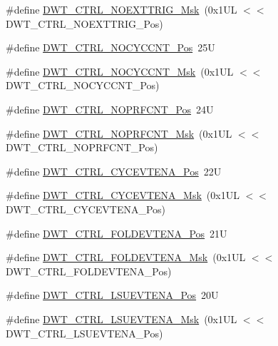 \begin{DoxyCompactItemize}
\item 
\#define \hyperlink{group___c_m_s_i_s___d_w_t_gacc7d15edf7a27147c422099ab475953e}{D\+W\+T\+\_\+\+C\+T\+R\+L\+\_\+\+N\+O\+E\+X\+T\+T\+R\+I\+G\+\_\+\+Msk}~(0x1\+U\+L $<$$<$ D\+W\+T\+\_\+\+C\+T\+R\+L\+\_\+\+N\+O\+E\+X\+T\+T\+R\+I\+G\+\_\+\+Pos)
\item 
\#define \hyperlink{group___c_m_s_i_s___d_w_t_ga337f6167d960f57f12aa382ffecce522}{D\+W\+T\+\_\+\+C\+T\+R\+L\+\_\+\+N\+O\+C\+Y\+C\+C\+N\+T\+\_\+\+Pos}~25U
\item 
\#define \hyperlink{group___c_m_s_i_s___d_w_t_gaf40c8d7a4fd978034c137e90f714c143}{D\+W\+T\+\_\+\+C\+T\+R\+L\+\_\+\+N\+O\+C\+Y\+C\+C\+N\+T\+\_\+\+Msk}~(0x1\+U\+L $<$$<$ D\+W\+T\+\_\+\+C\+T\+R\+L\+\_\+\+N\+O\+C\+Y\+C\+C\+N\+T\+\_\+\+Pos)
\item 
\#define \hyperlink{group___c_m_s_i_s___d_w_t_gad52a0e5be84363ab166cc17beca0d048}{D\+W\+T\+\_\+\+C\+T\+R\+L\+\_\+\+N\+O\+P\+R\+F\+C\+N\+T\+\_\+\+Pos}~24U
\item 
\#define \hyperlink{group___c_m_s_i_s___d_w_t_gafd8448d7db4bc51f27f202e6e1f27823}{D\+W\+T\+\_\+\+C\+T\+R\+L\+\_\+\+N\+O\+P\+R\+F\+C\+N\+T\+\_\+\+Msk}~(0x1\+U\+L $<$$<$ D\+W\+T\+\_\+\+C\+T\+R\+L\+\_\+\+N\+O\+P\+R\+F\+C\+N\+T\+\_\+\+Pos)
\item 
\#define \hyperlink{group___c_m_s_i_s___d_w_t_ga0cb0640aaeb18a626d7823570d5c3cb6}{D\+W\+T\+\_\+\+C\+T\+R\+L\+\_\+\+C\+Y\+C\+E\+V\+T\+E\+N\+A\+\_\+\+Pos}~22U
\item 
\#define \hyperlink{group___c_m_s_i_s___d_w_t_ga40554bd81460e39abf08810f45fac1a2}{D\+W\+T\+\_\+\+C\+T\+R\+L\+\_\+\+C\+Y\+C\+E\+V\+T\+E\+N\+A\+\_\+\+Msk}~(0x1\+U\+L $<$$<$ D\+W\+T\+\_\+\+C\+T\+R\+L\+\_\+\+C\+Y\+C\+E\+V\+T\+E\+N\+A\+\_\+\+Pos)
\item 
\#define \hyperlink{group___c_m_s_i_s___d_w_t_ga5602b0707f446ce78d88ff2a3a82bfff}{D\+W\+T\+\_\+\+C\+T\+R\+L\+\_\+\+F\+O\+L\+D\+E\+V\+T\+E\+N\+A\+\_\+\+Pos}~21U
\item 
\#define \hyperlink{group___c_m_s_i_s___d_w_t_ga717e679d775562ae09185a3776b1582f}{D\+W\+T\+\_\+\+C\+T\+R\+L\+\_\+\+F\+O\+L\+D\+E\+V\+T\+E\+N\+A\+\_\+\+Msk}~(0x1\+U\+L $<$$<$ D\+W\+T\+\_\+\+C\+T\+R\+L\+\_\+\+F\+O\+L\+D\+E\+V\+T\+E\+N\+A\+\_\+\+Pos)
\item 
\#define \hyperlink{group___c_m_s_i_s___d_w_t_gaea5d1ee72188dc1d57b54c60a9f5233e}{D\+W\+T\+\_\+\+C\+T\+R\+L\+\_\+\+L\+S\+U\+E\+V\+T\+E\+N\+A\+\_\+\+Pos}~20U
\item 
\#define \hyperlink{group___c_m_s_i_s___d_w_t_gac47427f455fbc29d4b6f8a479169f2b2}{D\+W\+T\+\_\+\+C\+T\+R\+L\+\_\+\+L\+S\+U\+E\+V\+T\+E\+N\+A\+\_\+\+Msk}~(0x1\+U\+L $<$$<$ D\+W\+T\+\_\+\+C\+T\+R\+L\+\_\+\+L\+S\+U\+E\+V\+T\+E\+N\+A\+\_\+\+Pos)

\end{DoxyCompactItemize}
